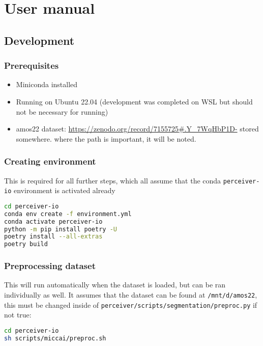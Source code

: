 \chapter{User manual}
 
\section{Development}

\subsection{Prerequisites}

\begin{itemize}
  \item{Miniconda installed}
  \item{Running on Ubuntu 22.04 (development was completed on WSL but should not be necessary for running)}
  \item{amos22 dataset: \url{https://zenodo.org/record/7155725#.Y_7WqHbP1D-} stored somewhere. where the path is important, it will be noted.}
\end{itemize}

\subsection{Creating environment}

This is required for all further steps, which all assume that the conda \lstinline{perceiver-io} environment is activated already

\begin{lstlisting}[language=bash]
cd perceiver-io
conda env create -f environment.yml
conda activate perceiver-io
python -m pip install poetry -U
poetry install --all-extras
poetry build
\end{lstlisting}

\subsection{Preprocessing dataset}

This will run automatically when the dataset is loaded, but can be ran individually as well. It assumes that the dataset can be found at \lstinline{/mnt/d/amos22}, this must be changed inside of \lstinline{perceiver/scripts/segmentation/preproc.py} if not true:

\begin{lstlisting}[language=bash]
cd perceiver-io
sh scripts/miccai/preproc.sh
\end{lstlisting}

